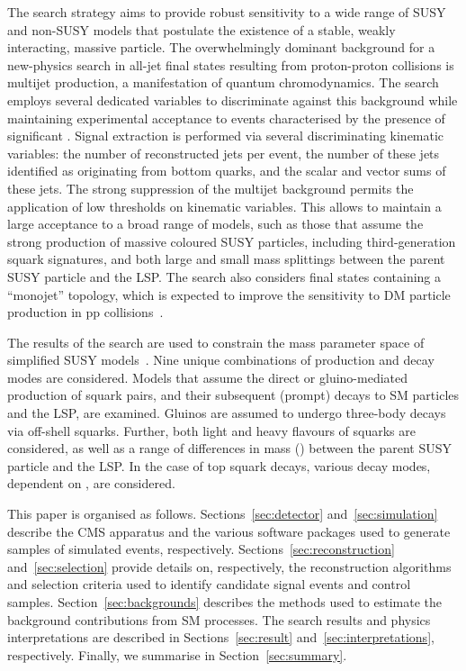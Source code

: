 The search strategy aims to provide robust sensitivity to a wide range
of SUSY and non-SUSY models that postulate the existence of a stable,
weakly interacting, massive particle. The overwhelmingly dominant
background for a new-physics search in all-jet final states resulting
from proton-proton collisions is multijet production, a manifestation
of quantum chromodynamics. The search employs several dedicated
variables to discriminate against this background while maintaining
experimental acceptance to events characterised by the presence of
significant \ptvecmiss. Signal extraction is performed via several
discriminating kinematic variables: the number of reconstructed jets
per event, the number of these jets identified as originating from
bottom quarks, and the scalar and vector \pt sums of these jets. The
strong suppression of the multijet background permits the application
of low thresholds on kinematic variables. This allows to maintain a
large acceptance to a broad range of models, such as those that assume
the strong production of massive coloured SUSY particles, including
third-generation squark signatures, and both large and small mass
splittings between the parent SUSY particle and the LSP. The search
also considers final states containing a ``monojet'' topology, which
is expected to improve the sensitivity to DM particle production in pp
collisions~\cite{Fox:2012ee, Buchmueller:2015eea}.

The results of the search are used to constrain the mass parameter
space of simplified SUSY models~\cite{Alwall:2008ag, Alwall:2008va,
  sms}. Nine unique combinations of production and decay modes are
considered. Models that assume the direct or gluino-mediated
production of squark pairs, and their subsequent (prompt) decays to SM
particles and the LSP, are examined. Gluinos are assumed to undergo
three-body decays via off-shell squarks. Further, both light and heavy
flavours of squarks are considered, as well as a range of differences
in mass (\dm) between the parent SUSY particle and the LSP. In the
case of top squark decays, various decay modes, dependent on \dm, are
considered.

This paper is organised as follows. Sections~\ref{sec:detector}
and~\ref{sec:simulation} describe the CMS apparatus and the various
software packages used to generate samples of simulated events,
respectively. Sections~\ref{sec:reconstruction}
and~\ref{sec:selection} provide details on, respectively, the
reconstruction algorithms and selection criteria used to identify
candidate signal events and control
samples. Section~\ref{sec:backgrounds} describes the methods used to
estimate the background contributions from SM processes. The search
results and physics interpretations are described in
Sections~\ref{sec:result} and~\ref{sec:interpretations},
respectively. Finally, we summarise in Section~\ref{sec:summary}.

